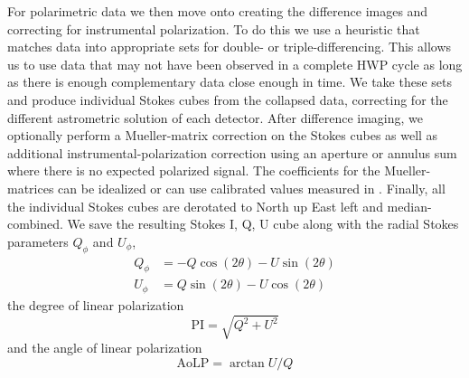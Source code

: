 For polarimetric data we then move onto creating the difference images and correcting for instrumental polarization. To do this we use a heuristic that matches data into appropriate sets for double- or triple-differencing. This allows us to use data that may not have been observed in a complete HWP cycle as long as there is enough complementary data close enough in time. We take these sets and produce individual Stokes cubes from the collapsed data, correcting for the different astrometric solution of each detector. After difference imaging, we optionally perform a Mueller-matrix correction on the Stokes cubes as well as additional instrumental-polarization correction using an aperture or annulus sum where there is no expected polarized signal. The coefficients for the Mueller-matrices can be idealized or can use calibrated values measured in \citet{zhang_characterizing_2023}. Finally, all the individual Stokes cubes are derotated to North up East left and median-combined. We save the resulting Stokes I, Q, U cube along with the radial Stokes parameters $Q_\phi$ and $U_\phi$, 
\begin{align}
    Q_\phi &= -Q\cos{\left(2\theta\right)} - U\sin{\left(2\theta\right)} \\
    U_\phi &= Q\sin{\left(2\theta\right)} - U\cos{\left(2\theta\right)}
\end{align}
the degree of linear polarization
\begin{equation}
    \mathrm{PI} = \sqrt{Q^2 + U^2}
\end{equation}
and the angle of linear polarization
\begin{equation}
    \mathrm{AoLP} = \arctan{U / Q}
\end{equation}